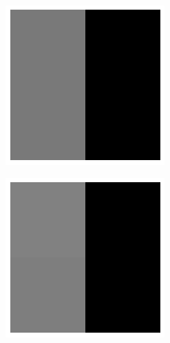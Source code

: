 \begin{figure}
	\begin{subfigure}{0.5\textwidth}
		\begin{centering}
			\includegraphics[width=0.65\linewidth]{Figures/test_images}
			\caption{}
			\label{fig:fake_image}
		\end{centering}
	\end{subfigure}
	\begin{subfigure}{0.5\textwidth}
		\begin{centering}
			\includegraphics[width=0.65\linewidth]{Figures/fake_image}
			\caption{} 
			\label{fig:real_image}
		\end{centering}
	\end{subfigure}

\end{figure}
